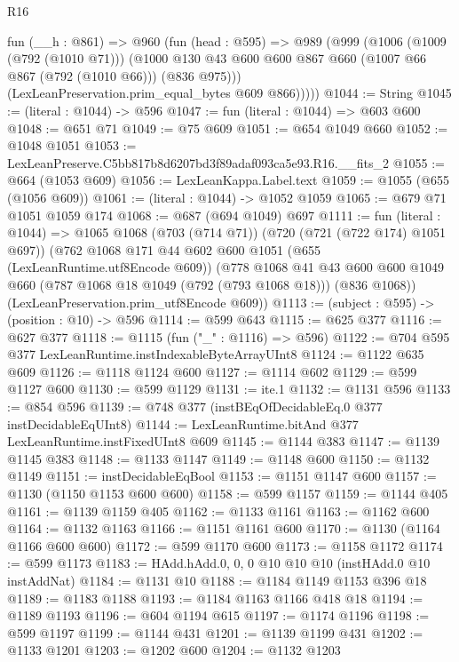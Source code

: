 \begin{lexlean}{R16}
\begin{coremodule}
      fun (__h : @861) =>
      @960
        (fun (head : @595) =>
        @989
          (@999
            (@1006
              (@1009 (@792 (@1010 @71)))
              (@1000 @130 @43 @600 @600 @867 @660 (@1007 @66 @867 (@792 (@1010 @66))) (@836 @975)))
            (LexLeanPreservation.prim_equal_bytes @609 @866)))))
@1044 := String
@1045 := (literal : @1044) -> @596
@1047 := fun (literal : @1044) => @603 @600
@1048 := @651 @71
@1049 := @75 @609
@1051 := @654 @1049 @660
@1052 := @1048 @1051
@1053 := LexLeanPreserve.C5bb817b8d6207bd3f89adaf093ca5e93.R16.__fits_2
@1055 := @664 (@1053 @609)
@1056 := LexLeanKappa.Label.text
@1059 := @1055 (@655 (@1056 @609))
@1061 := (literal : @1044) -> @1052 @1059
@1065 := @679 @71 @1051 @1059 @174
@1068 := @687 (@694 @1049) @697
@1111 := fun (literal : @1044) =>
  @1065
    @1068
    (@703 (@714 @71))
    (@720 (@721 (@722 @174) @1051 @697))
    (@762
      @1068
      @171
      @44
      @602
      @600
      @1051
      (@655 (LexLeanRuntime.utf8Encode @609))
      (@778
        @1068
        @41
        @43
        @600
        @600
        @1049
        @660
        (@787 @1068 @18 @1049 (@792 (@793 @1068 @18)))
        (@836 @1068))
      (LexLeanPreservation.prim_utf8Encode @609))
@1113 := (subject : @595) -> (position : @10) -> @596
@1114 := @599 @643
@1115 := @625 @377
@1116 := @627 @377
@1118 := @1115 (fun ("_" : @1116) => @596)
@1122 := @704 @595 @377 LexLeanRuntime.instIndexableByteArrayUInt8
@1124 := @1122 @635 @609
@1126 := @1118 @1124 @600
@1127 := @1114 @602
@1129 := @599 @1127 @600
@1130 := @599 @1129
@1131 := ite.{1}
@1132 := @1131 @596
@1133 := @854 @596
@1139 := @748 @377 (instBEqOfDecidableEq.{0} @377 instDecidableEqUInt8)
@1144 := LexLeanRuntime.bitAnd @377 LexLeanRuntime.instFixedUInt8 @609
@1145 := @1144 @383
@1147 := @1139 @1145 @383
@1148 := @1133 @1147
@1149 := @1148 @600
@1150 := @1132 @1149
@1151 := instDecidableEqBool
@1153 := @1151 @1147 @600
@1157 := @1130 (@1150 @1153 @600 @600)
@1158 := @599 @1157
@1159 := @1144 @405
@1161 := @1139 @1159 @405
@1162 := @1133 @1161
@1163 := @1162 @600
@1164 := @1132 @1163
@1166 := @1151 @1161 @600
@1170 := @1130 (@1164 @1166 @600 @600)
@1172 := @599 @1170 @600
@1173 := @1158 @1172
@1174 := @599 @1173
@1183 := HAdd.hAdd.{0, 0, 0} @10 @10 @10 (instHAdd.{0} @10 instAddNat)
@1184 := @1131 @10
@1188 := @1184 @1149 @1153 @396 @18
@1189 := @1183 @1188
@1193 := @1184 @1163 @1166 @418 @18
@1194 := @1189 @1193
@1196 := @604 @1194 @615
@1197 := @1174 @1196
@1198 := @599 @1197
@1199 := @1144 @431
@1201 := @1139 @1199 @431
@1202 := @1133 @1201
@1203 := @1202 @600
@1204 := @1132 @1203

\end{coremodule}
\end{lexlean}
